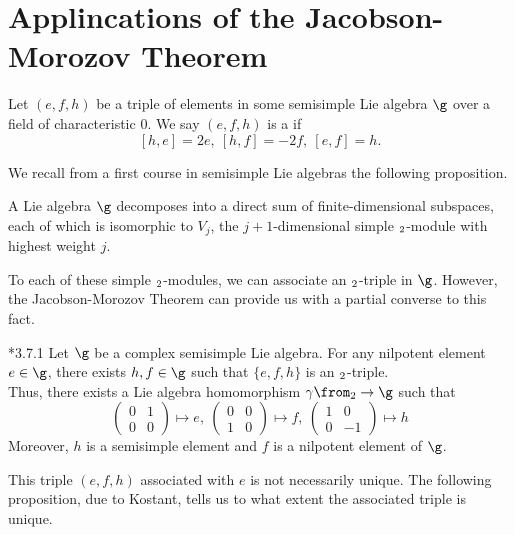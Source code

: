 \section{Applincations of the Jacobson-Morozov Theorem}
\begin{defn}
  Let \((e,f,h)\) be a triple of elements in some semisimple Lie
  algebra \(\g\) over a field of characteristic \(0\). We say
  \((e,f,h)\) is a  if \[
    [h,e] =  2e, \ [h,f] = -2f, \ [e,f] = h.
  \]
\end{defn}
We recall from a first course in semisimple Lie algebras the following
proposition. 
\begin{prop}
  A Lie algebra \(\g\) decomposes into a direct sum of
  finite-dimensional subspaces, each of which is isomorphic to
  \(V_j\), the \(j+1\)-dimensional simple \(\sl_2\)-module with
  highest weight \(j\). 
\end{prop}
To each of these simple \(\sl_2\)-modules, we can associate an
\(\sl_2\)-triple in \(\g\). However, the Jacobson-Morozov Theorem can
provide us with a partial converse to this fact.
\begin{thm}
  \cite{cg}*{3.7.1} Let \(\g\) be a complex semisimple Lie
  algebra. For any nilpotent 
  element \(e \in \g\), there 
  exists \(h,f \in \g\) such that \(\{e,f,h\}\) is an
  \(\sl_2\)-triple. \\

  Thus, there exists a Lie algebra homomorphism \(\gamma \from \sl_2
  \to \g\) such that \[
    \left(
      \begin{array}{cc}
        0&1\\
        0&0
      \end{array}
\right) \mapsto e, \ \left(
  \begin{array}{cc}
    0&0\\
    1&0
  \end{array}
\right) \mapsto f, \ \left(
  \begin{array}{cc}
    1&0\\
    0&-1
  \end{array}
\right) \mapsto h
\]
  Moreover, \(h\) is a semisimple element and \(f\) is a nilpotent
  element of \(\g\).
\end{thm}
\begin{rmk}
  This triple \((e,f,h)\) associated with \(e\) is not necessarily
  unique. The following proposition, due to Kostant, tells us to what
  extent the associated triple is unique.
\end{rmk}

